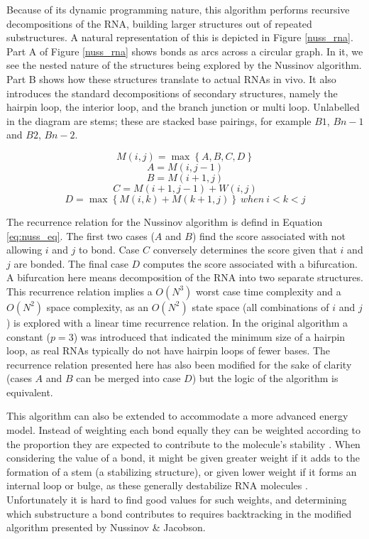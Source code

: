 \documentclass{cshonours}
\begin{document}
Because of its dynamic programming
nature, this algorithm performs recursive decompositions of the RNA, building
larger structures out of repeated substructures. A natural representation of this is
depicted in Figure \ref{nuss_rna}. Part A of Figure \ref{nuss_rna} shows bonds as arcs across a circular
graph. In it, we see the nested nature of the structures being explored by the
Nussinov algorithm. Part B shows how these structures translate to actual RNAs in vivo. It also introduces the standard decompositions
of secondary structures, namely the hairpin loop, the interior loop, and the branch
junction or multi loop. Unlabelled in the diagram are stems; these are stacked
base pairings, for example $B1$, $Bn - 1$ and $B2$, $Bn - 2$.


\begin{equation} \label{eq:nuss_eq}
	M(i, j) = \max \left\lbrace A, B, C, D \right\rbrace 
\end{equation}
\[
A = M(i, j-1)
\]
\[
B = M(i+1, j)
\]
\[
C = M(i+1, j-1) + W(i, j)
\]
\[
D = \max \left\lbrace M(i, k) + M(k+1, j) \right\rbrace \: when \: i < k < j
\]



The recurrence relation for the Nussinov algorithm is defind in Equation \ref{eq:nuss_eq}. The first two cases ($A$ and $B$) find the score associated with not allowing $i$ and $j$ to bond. Case $C$ conversely determines the score given that $i$ and $j$ are bonded. The final case $D$ computes the score associated with a bifurcation. A bifurcation here means decomposition of the RNA into two separate structures. This recurrence relation implies a $O(N^3)$
worst case time complexity and a $O(N^2)$ space complexity, as an $O(N^2)$ state space (all combinations of $i$ and $j$) is explored
with a linear time recurrence relation. In the original algorithm a constant ($p = 3$) was introduced that indicated the minimum size of a hairpin loop, as real RNAs typically do not have hairpin loops of fewer bases. The recurrence relation presented here has also been modified for the sake of clarity (cases $A$ and $B$ can be merged into case $D$) but the logic of the algorithm is equivalent.


This algorithm can also be extended to accommodate a more advanced energy
model. Instead of weighting each bond equally they can be weighted
according to the proportion they are expected to contribute to the molecule's
stability \cite{nussinov1980fast}. When considering the value of a bond, it might be given greater
weight if it adds to the formation of a stem (a stabilizing structure), or
given lower weight if it forms an internal loop or bulge, as these generally
destabilize RNA molecules \cite{nussinov1980fast}. Unfortunately it is hard to find good values for
such weights, and determining which substructure a bond contributes to requires
backtracking in the modified algorithm presented by Nussinov \& Jacobson.
\end{document}
